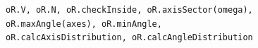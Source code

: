 \documentclass[compress]{beamer}
\begin{document}
\begin{frame}[fragile]
\begin{columns}
\begin{column}{0.45\textwidth}
    \end{column}
  \end{columns}

  \pause

  \begin{lstlisting}[style=input]
oR.V, oR.N, oR.checkInside, oR.axisSector(omega),
oR.maxAngle(axes), oR.minAngle,
oR.calcAxisDistribution, oR.calcAngleDistribution
  \end{lstlisting}


\end{frame}
\end{document}
